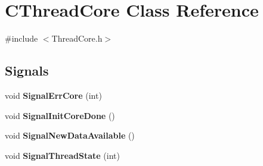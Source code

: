 \hypertarget{classCThreadCore}{
\section{CThreadCore Class Reference}
\label{classCThreadCore}
}


{\ttfamily \#include $<$ThreadCore.h$>$}\subsection*{Signals}
\begin{DoxyCompactItemize}
\item 
\hypertarget{classCThreadCore_a715eb432de93b30314f523e58bb6381b}{
void {\bfseries SignalErrCore} (int)}
\label{classCThreadCore_a715eb432de93b30314f523e58bb6381b}

\item 
\hypertarget{classCThreadCore_a8dfdedd72e8e108b4c72bc26cf881149}{
void {\bfseries SignalInitCoreDone} ()}
\label{classCThreadCore_a8dfdedd72e8e108b4c72bc26cf881149}

\item 
\hypertarget{classCThreadCore_a233ff4a618739e9c096fc3eeed4b4296}{
void {\bfseries SignalNewDataAvailable} ()}
\label{classCThreadCore_a233ff4a618739e9c096fc3eeed4b4296}

\item 
\hypertarget{classCThreadCore_ad418dc626ec7ac1c3f7b198d200b694d}{
void {\bfseries SignalThreadState} (int)}
\label{classCThreadCore_ad418dc626ec7ac1c3f7b198d200b694d}

\end{DoxyCompactItemize}
